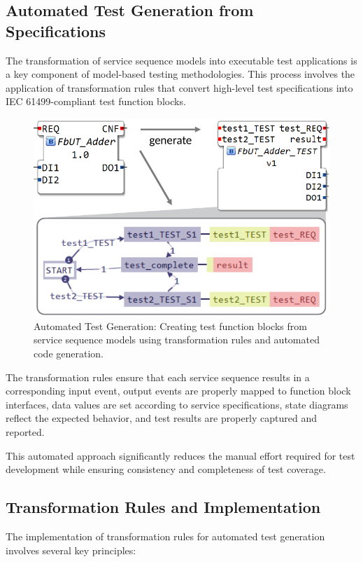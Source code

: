 \subsection{Automated Test Generation from Specifications}

The transformation of service sequence models into executable test applications is a key component of model-based testing methodologies. This process involves the application of transformation rules that convert high-level test specifications into IEC 61499-compliant test function blocks.

\begin{figure}[!htbp]
    \centering
    \includegraphics[width=0.8\columnwidth]{MX_Papers/Paper9/Figures/testFB-crop.pdf}
    \caption{Automated Test Generation: Creating test function blocks from service sequence models using transformation rules and automated code generation.}
    \label{fig:test_generation}
\end{figure}

The transformation rules ensure that each service sequence results in a corresponding input event, output events are properly mapped to function block interfaces, data values are set according to service specifications, state diagrams reflect the expected behavior, and test results are properly captured and reported.

This automated approach significantly reduces the manual effort required for test development while ensuring consistency and completeness of test coverage.

\subsection{Transformation Rules and Implementation}

The implementation of transformation rules for automated test generation involves several key principles:

